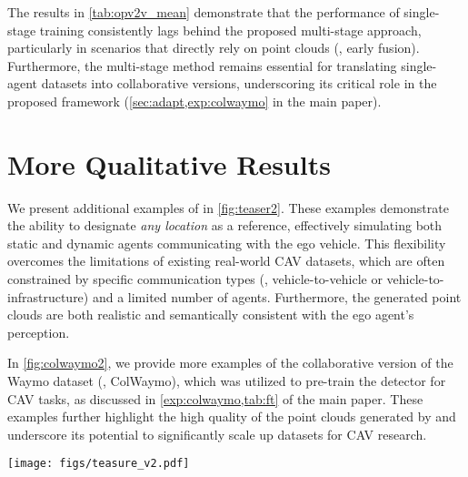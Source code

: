The results in \cref{tab:opv2v_mean} demonstrate that the performance of single-stage training consistently lags behind the proposed multi-stage approach, particularly in scenarios that directly rely on point clouds (\ie, early fusion). Furthermore, the multi-stage method remains essential for translating single-agent datasets into collaborative versions, underscoring its critical role in the proposed framework (\cf \cref{sec:adapt,exp:colwaymo} in the main paper).



\section{More Qualitative Results}
\label{sup:qual}
We present additional examples of \ours in \cref{fig:teaser2}. These examples demonstrate the ability to designate \emph{any location} as a reference, effectively simulating both static and dynamic agents communicating with the ego vehicle. This flexibility overcomes the limitations of existing real-world CAV datasets, which are often constrained by specific communication types (\ie, vehicle-to-vehicle or vehicle-to-infrastructure) and a limited number of agents. Furthermore, the generated point clouds are both realistic and semantically consistent with the ego agent's perception.

In \cref{fig:colwaymo2}, we provide more examples of the collaborative version of the Waymo dataset (\ie, ColWaymo), which was utilized to pre-train the detector for CAV tasks, as discussed in \cref{exp:colwaymo,tab:ft} of the main paper. These examples further highlight the high quality of the point clouds generated by \ours and underscore its potential to significantly scale up datasets for CAV research. 



\begin{figure*}
\centering
\texttt{[image: figs/teasure\_v2.pdf]}

\caption{
\label{fig:teaser2}
\small \textbf{Illustration of the proposed problem and solution, Transfer Your Perspective (\ours).} (a) A given sensory data captured by the {\color{red} ego-car (red triangle)}. (b) A generated sensory data by \ours, seeing from the viewpoint of \textcolor{customgreen}{another vehicle (green triangle)} in the same scene. (c) A generated sensory data, seeing from an imaginary {\color{blue} static agent like roadside units (blue icon)}. (d) Putting all the sensory data together, given or generated, \ours enables the development of collaborative perception with little or no real collaborative driving data.}
\end{figure*}

